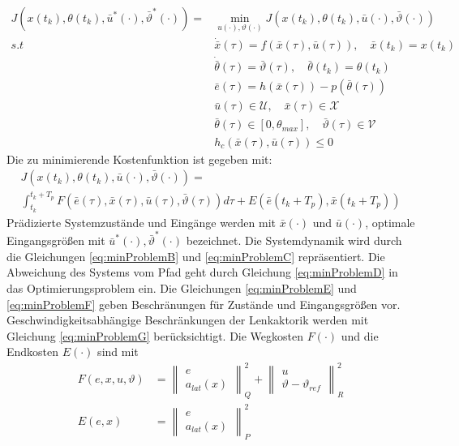 \begin{subequations}
\begin{align}
    J(x(t_k),\theta(t_k),\bar{u}^{*}(\cdot),\bar{\vartheta}^{*}(\cdot)) = &\underset{u(\cdot), \vartheta(\cdot)}{\min} J(x(t_k), \theta(t_k), \bar{u}(\cdot), \bar{\vartheta}(\cdot)) \label{eq:minProblemA}\\
    s.t \hspace{30pt} &\dot{\bar{x}}(\tau) = f(\bar{x}(\tau), \bar{u}(\tau)), \quad \bar{x}(t_k) = x(t_k) \label{eq:minProblemB}\\
    &\dot{\bar{\theta}}(\tau) = \bar{\vartheta}(\tau), \quad \bar{\theta}(t_k) = \theta(t_k) \label{eq:minProblemC}\\
    &\bar{e}(\tau) = h(\bar{x}(\tau)) - p(\bar{\theta}(\tau)) \label{eq:minProblemD}\\
    &\bar{u}(\tau) \in \mathcal{U}, \quad \bar{x}(\tau) \in \mathcal{X} \label{eq:minProblemE}\\
    &\bar{\theta}(\tau) \in [0, \theta_{max}], \quad \bar{\vartheta}(\tau) \in \mathcal{V} \label{eq:minProblemF}\\
    &h_c(\bar{x}(\tau), \bar{u}(\tau)) \leq 0 \label{eq:minProblemG}
\end{align}
\end{subequations}
\noindent Die zu minimierende Kostenfunktion ist gegeben mit:
\begin{multline}
    J(x(t_k),\theta(t_k),\bar{u}(\cdot),\bar{\vartheta}(\cdot)) = \\ \int_{t_k}^{t_k + T_p} F(\bar{e}(\tau),\bar{x}(\tau),\bar{u}(\tau),\bar{\vartheta}(\tau))d\tau + E(\bar{e}(t_k+T_p),\bar{x}(t_k+T_p))
\end{multline}
\noindent Prädizierte Systemzustände und Eingänge werden mit $\bar{x}(\cdot)$ und $\bar{u}(\cdot)$, optimale Eingangsgrößen mit $\bar{u}^{*}(\cdot),\bar{\vartheta}^{*}(\cdot)$ bezeichnet. Die Systemdynamik wird durch die Gleichungen \ref{eq:minProblemB} und \ref{eq:minProblemC} repräsentiert. Die Abweichung des Systems vom Pfad geht durch Gleichung \ref{eq:minProblemD} in das Optimierungsproblem ein. Die Gleichungen \ref{eq:minProblemE} und \ref{eq:minProblemF} geben Beschränungen für Zustände und Eingangsgrößen vor. Geschwindigkeitsabhängige Beschränkungen der Lenkaktorik werden mit Gleichung \ref{eq:minProblemG} berücksichtigt. 
\noindent Die Wegkosten $F(\cdot)$ und die Endkosten $E(\cdot)$ sind mit
\begin{align}
    F(e, x, u, \vartheta) &= \left\| \begin{matrix} e \\a_{lat}(x) \end{matrix} \right\|_Q^2 + \left\| \begin{matrix} u \\ \vartheta - \vartheta_{ref} \end{matrix} \right\|_R^2 \\
    E(e, x) &= \left\| \begin{matrix} e \\ a_{lat}(x) \end{matrix} \right\|_P^2
\end{align}
